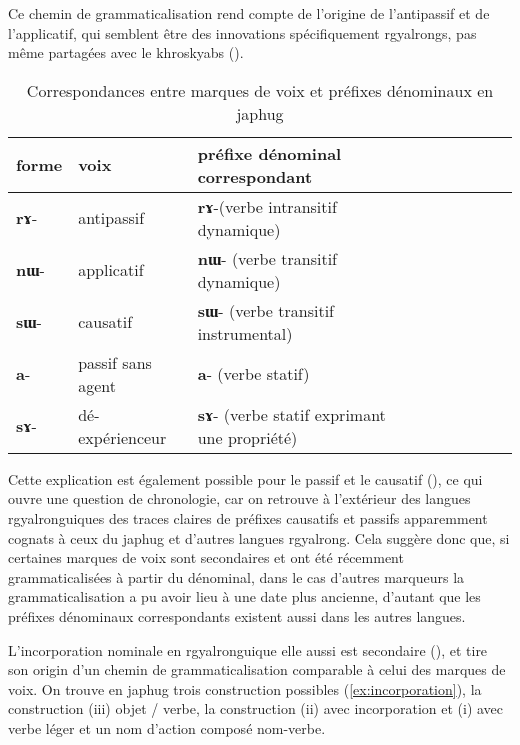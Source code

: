 \documentclass[oldfontcommands,oneside,a4paper,11pt]{article}
\newcommand{\ipa}[1]{{\phon\textbf{\mbox{#1}}}} %
\begin{document}
Ce chemin de grammaticalisation rend compte de l'origine de l'antipassif et de l'applicatif, qui semblent être des innovations spécifiquement rgyalrongs, pas même partagées avec le khroskyabs  (\citealt{jacques14antipassive}).


 
 
\begin{table}[h]
\caption{Correspondances entre marques de voix et préfixes dénominaux en japhug} \centering \label{tab:denominal}
\begin{tabular}{lllllllll} \toprule
forme & voix & préfixe dénominal correspondant \\
\midrule
\ipa{rɤ}- & antipassif &    \ipa{rɤ}-(verbe intransitif dynamique) \\
\ipa{nɯ}- & applicatif &    \ipa{nɯ}- (verbe transitif dynamique) \\
\ipa{sɯ}- & causatif &    \ipa{sɯ}- (verbe transitif instrumental)\\
\ipa{a}- & passif sans agent &    \ipa{a}- (verbe statif) \\
\ipa{sɤ}-  & dé-expérienceur &    \ipa{sɤ}- (verbe statif exprimant une propriété)\\
    \bottomrule
\end{tabular}
\end{table}


Cette explication est également possible pour le passif et le causatif   (\citealt{jacques15causative}), ce qui ouvre une question de chronologie, car on retrouve à l'extérieur des langues rgyalronguiques des traces claires de préfixes causatifs et passifs apparemment cognats à ceux du japhug et d'autres langues rgyalrong. Cela suggère donc que, si certaines marques de voix sont secondaires et ont été récemment grammaticalisées à partir du dénominal, dans le cas d'autres marqueurs la grammaticalisation a pu avoir lieu à une date plus ancienne, d'autant que les préfixes dénominaux correspondants existent aussi dans les autres langues.

L'incorporation nominale en rgyalronguique elle aussi est secondaire  (\citealt{jacques12incorp, lai13affixale}), et tire son origin d'un chemin de grammaticalisation comparable à celui des marques de voix. On trouve en japhug trois construction possibles (\ref{ex:incorporation}), la construction (iii) objet / verbe, la construction (ii) avec incorporation et (i) avec verbe léger et un nom d'action composé nom-verbe.
\end{document}
